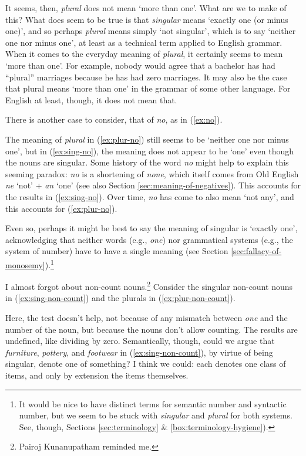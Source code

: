 It seems, then, \textit{plural} does not mean `more than one'. What are we to make of this? What does seem to be true is that \textit{singular} means `exactly one (or minus one)', and so perhaps \textit{plural} means simply `not singular', which is to say `neither one nor minus one', at least as a technical term applied to English grammar. When it comes to the everyday meaning of \textit{plural}, it certainly seems to mean `more than one'. For example, nobody would agree that a bachelor has had ``plural'' marriages because he has had zero marriages. It may also be the case that plural means `more than one' in the grammar of some other language. For English at least, though, it does not mean that.

There is another case to consider, that of \textit{no}, as in (\ref{ex:no}).

\ea \label{ex:no}
    \label{ex:sing-no}
    \label{ex:plur-no}
    \z 
\z
The meaning of \textit{plural} in (\ref{ex:plur-no}) still seems to be `neither one nor minus one', but in (\ref{ex:sing-no}), the meaning does not appear to be `one' even though the nouns are singular. Some history of the word \textit{no} might help to explain this seeming paradox: \textit{no} is a shortening of \textit{none}, which itself comes from Old English \textit{ne} `not' + \textit{an} `one' (see also Section \ref{sec:meaning-of-negatives}). This accounts for the results in (\ref{ex:sing-no}). Over time, \textit{no} has come to also mean `not any', and this accounts for (\ref{ex:plur-no}).

Even so, perhaps it might be best to say the  meaning of singular is `exactly one', acknowledging that neither words (e.g., \textit{one}) nor grammatical systems (e.g., the system of number) have to have a single meaning (see Section \ref{sec:fallacy-of-monosemy}).\footnote{It would be nice to have distinct terms for semantic number and syntactic number, but we seem to be stuck with \textit{singular} and \textit{plural} for both systems. See, though, Sections \ref{sec:terminology} \& \ref{box:terminology-hygiene}).}

I almost forgot about non-count nouns.\footnote{Pairoj Kunanupatham reminded me.} Consider the singular non-count nouns in (\ref{ex:sing-non-count}) and the plurals in (\ref{ex:plur-non-count}).

\ea \label{ex:undefined}
    \label{ex:sing-non-count}
    \label{ex:plur-non-count}
    \z 
\z
Here, the test doesn't help, not because of any mismatch between \textit{one} and the number of the noun, but because the nouns don't allow counting. The results are undefined, like dividing by zero. Semantically, though, could we argue that \textit{furniture}, \textit{pottery}, and \textit{footwear} in (\ref{ex:sing-non-count}), by virtue of being singular, denote one of something? I think we could: each denotes one class of items, and only by extension the items themselves.

